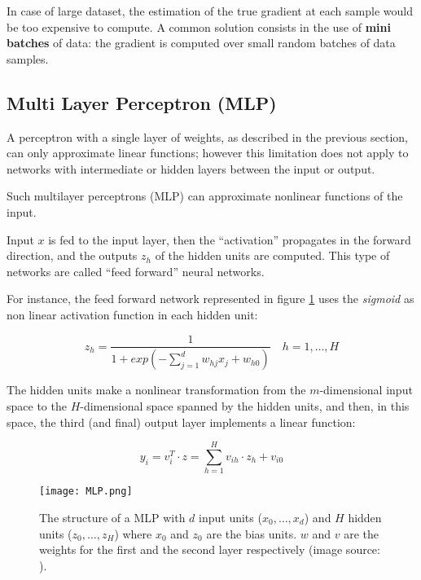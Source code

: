 In case of large dataset, the estimation of the true gradient at each sample would be too expensive to compute. A common solution consists in the use of \textbf{mini batches} of data: the gradient is computed over small random batches of data samples.

\subsection{Multi Layer Perceptron (MLP)}

A perceptron with a single layer of weights, as described in the previous section, can only approximate linear functions; however this limitation does not apply to networks with intermediate or hidden layers between the input or output.
 
Such multilayer perceptrons (MLP) can approximate nonlinear functions of the input.

Input $x$ is fed to the input layer, then the ``activation'' propagates in the forward direction, and the outputs $z_h$ of the hidden units are computed. This type of networks are called ``feed forward'' neural networks.

For instance, the feed forward network represented in figure \ref{fig:ffnn} uses the \textit{sigmoid} as non linear activation function in each hidden unit:

\begin{equation}
    \tag{Sigmoid function}
    z_h = \frac{1}{1 + exp(- \sum_{j=1}^d w_{hj} x_j + w_{h0})} \quad h = 1, \dots, H
\end{equation}

The hidden units make a nonlinear transformation from the $m$-dimensional input space to the $H$-dimensional space spanned by the hidden units, and then, in this space, the third (and final) output layer implements a linear function:

\begin{equation}
    y_i = v_i^T \cdot z = \sum_{h = 1}^H v_{ih} \cdot z_h + v_{i0}
\end{equation}

\begin{figure}[H]
  \centering
  \texttt{[image: MLP.png]}
  \caption{The structure of a MLP with $d$ input units ($x_0, \dots, x_d$) and $H$ hidden units ($z_0, \dots, z_H$) where $x_0$ and $z_0$ are the bias units. $w$ and $v$ are the weights for the first and the second layer respectively (image source: \cite{ml}).}
  \label{fig:ffnn}
\end{figure}

